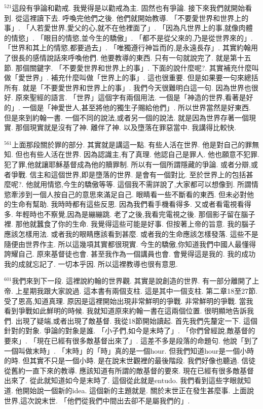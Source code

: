 \documentclass{book}
\begin{document}
$^{521}$這段有爭論和勸戒.
我覺得是以勸戒為主.
固然也有爭論.
接下來我們就開始看到.
從這裡讀下去.
呼喚完他們之後.
他們就開始教導.
「不要愛世界和世界上的事」.
「人若愛世界,愛父的心,就不在他裡面了」.
「因為凡世界上的事,就像肉體的情慾」.
「眼目的情慾,並今生的驕傲」.
「都不是從父來的,乃是從世界來的」.
「世界和其上的情慾,都要過去」.
「唯獨遵行神旨而的,是永遠長存」.
其實約翰用了很長的感情說話來呼喚他們.
他要教導的東西.
只有一句就說完了.
就是第十五節.
那個關鍵字.
「不要愛世界和世界上的事」.
下面的說什麼呢?.
其實補充什麼叫做「愛世界」.
補充什麼叫做「世界上的事」.
這也很重要.
但是如果要一句來總括所有.
就是「不要愛世界和世界上的事」.
我們今天很難明白這一句.
因為世界也很好.
原來聖經的語言.
「世界」這個字有兩個用法.
一個是「神造的世界,看著是好的」.
一個是「神愛世人,甚至將他的獨生子賜給他們」.
所以世界當然是好東西.
但是來到約翰一書.
一個不同的說法,或者另一個的說法.
就是因為世界存著一個現實.
那個現實就是沒有了神.
離伴了神.
以及墮落在罪惡當中.
我講得比較快.

$^{561}$上面那段關於罪的部分.
其實就是講這一點.
有些人活在世界.
他是對自己的罪無知.
但也有些人活在世界.
因為認識主,有了真理.
他認自己是罪人.
他也願意不犯罪.
犯了罪,他就讓耶穌基督成為他的贖罪制.
所以有一個所謂隱藏的爭論.
或者分辯,或者爭戰.
信主和這個世界,即是墮落的世界.
是會有一個對比.
至於世界上的包括甚麼呢?.
他就用情慾,今生的驕傲等等.
這個我不需詳說了,大家都可以想像到.
所謂情慾牽涉到一個人按自己的意思來滿足自己.
眼睛看一些不斷看的東西.
但未必對他的生命有幫助.
我時時都有這些反思.
因為我們看手機看得多.
又或者看電視看得多.
年輕時也不察覺,因為是繃繃跳.
老了之後,我看完電視之後.
那個影子留在腦子裡.
那他就蠶食了你的生命.
我覺得這些可能是好事.
但按著上帝的旨意.
我的腦子應該怎樣用法.
或者我的眼睛應該看到甚麼.
或者我的生命應該怎樣發落.
這些不是隨便由世界作主.
所以這幾項其實都很現實.
今生的驕傲,你知道我們中國人最懂得誇耀自己.
原來基督徒也會.
甚至我作為一個講員也會.
會覺得這是我的.
我的成功我的成就忘記了.
一切本乎因.
所以這裡教導也很有意思.

$^{601}$我們來到下一段.
這裡說約翰的世界觀.
其實是說創造的世界.
有一部分離開了上帝.
上星期我跟大家說過.
這本書有兩個支柱.
這是其中一個支柱.
第二章18至27節.
受了恩高,知道真理.
原因是這裡開始出現非常鮮明的爭戰.
非常鮮明的爭戰.
當我看到爭戰如此鮮明的時候.
我就知道原來約翰一書在這兩個位置.
很明顯地告訴我們.
出現了疑端,或者出現了敵基督.
我從18節開始讀起.
首先我們先釐定一下.
這個針對的對象.
爭論的對象是誰.
「小子們,如今是末時了」.
「你們曾經說,敵基督的要來」.
「現在已經有很多敵基督出來了」.
這差不多是段落的命題句.
他說「到了一個叫做末時」.
「末時」的「時」真的是一個hour.
但我們知道hour是一個小時的時.
但其實不只是一個小時.
是在說末世觀裡的最後階段.
我們好像也聽過.
信徒從舊約一直下來的教導.
應該知道有所謂的敵基督的要來.
現在已經有很多敵基督出來了.
從此就知道如今是末時了.
這個從此就是entudo.
我們看到這些字眼就知道.
他開始說一個新的idea.
這個新的主題就是.
關於末世正在發生甚麼事.
上面說世界,這次說末世.
「他們從我們中間出去卻不是屬我們的」.
\end{document}
